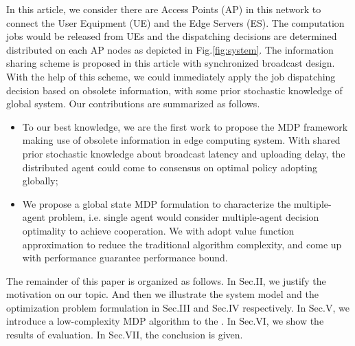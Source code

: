 In this article, we consider there are Access Points (AP) in this network to connect the User Equipment (UE) and the Edge Servers (ES).
The computation jobs would be released from UEs and the dispatching decisions are determined distributed on each AP nodes as depicted in Fig.\ref{fig:system}.
The information sharing scheme is proposed in this article with synchronized broadcast design. With the help of this scheme, we could immediately apply the job dispatching decision based on obsolete information, with some prior stochastic knowledge of global system.
Our contributions are summarized as follows.
\begin{itemize}
    \item To our best knowledge, we are the first work to propose the MDP framework making use of obsolete information in edge computing system. With shared prior stochastic knowledge about broadcast latency and uploading delay, the distributed agent could come to consensus on optimal policy adopting globally;
    \item We propose a global state MDP formulation to characterize the multiple-agent problem, i.e. single agent would consider multiple-agent decision optimality to achieve cooperation.
    We with adopt value function approximation to reduce the traditional algorithm complexity, and come up with performance guarantee performance bound.
\end{itemize}


The remainder of this paper is organized as follows.
In Sec.II, we justify the motivation on our topic.
And then we illustrate the system model and the optimization problem formulation in Sec.III and Sec.IV respectively.
In Sec.V, we introduce a low-complexity MDP algorithm to the .
In Sec.VI, we show the results of evaluation.
In Sec.VII, the conclusion is given.